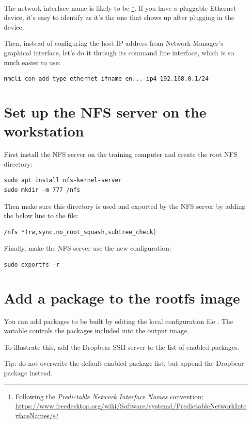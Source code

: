 The network interface name is likely to be
\footnote{Following the {\em Predictable Network Interface
Names} convention:
\url{https://www.freedesktop.org/wiki/Software/systemd/PredictableNetworkInterfaceNames/}}.
If you have a pluggable Ethernet device, it's easy to identify as it's
the one that shows up after plugging in the device.

Then, instead of configuring the host IP address from Network
Manager's graphical interface, let's do it through its command line
interface, which is so much easier to use:

\begin{verbatim}
nmcli con add type ethernet ifname en... ip4 192.168.0.1/24
\end{verbatim}

\section{Set up the NFS server on the workstation}

First install the NFS server on the training computer and create the root NFS
directory:
\begin{verbatim}
sudo apt install nfs-kernel-server
sudo mkdir -m 777 /nfs
\end{verbatim}

Then make sure this directory is used and exported by the NFS server by adding
the below line to the  file:

\begin{verbatim}
/nfs *(rw,sync,no_root_squash,subtree_check)
\end{verbatim}

Finally, make the NFS server use the new configuration:
\begin{verbatim}
sudo exportfs -r
\end{verbatim}

\section{Add a package to the rootfs image}

You can add packages to be built by editing the local configuration file
. The  variable controls the
packages included into the output image.

To illustrate this, add the Dropbear SSH server to the list of enabled
packages.

Tip: do not overwrite the default enabled package list, but append the Dropbear
package instead.

